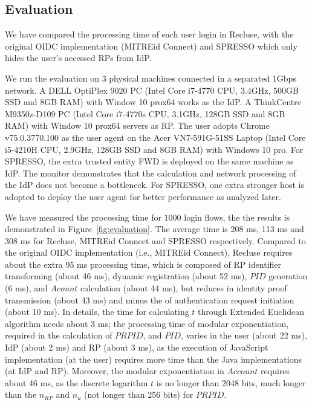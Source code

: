 \subsection{Evaluation}
\label{sec:evaluation}
We have compared the processing time of each user login in Recluse, with the original OIDC implementation (MITREid Connect) and SPRESSO which only hides the user's accessed RPs from IdP.

 We run the evaluation on 3 physical machines connected in a separated 1Gbps network. A DELL OptiPlex 9020 PC (Intel Core i7-4770 CPU, 3.4GHz, 500GB SSD and 8GB RAM) with Window 10 prox64 works as the IdP. A ThinkCentre M9350z-D109 PC (Intel Core i7-4770s CPU, 3.1GHz, 128GB SSD and 8GB RAM) with  Window 10 prox64 servers as RP. The user adopts Chrome v75.0.3770.100 as the user agent on the Acer VN7-591G-51SS Laptop (Intel Core i5-4210H CPU, 2.9GHz, 128GB SSD and 8GB RAM) with  Windows 10 pro. For SPRESSO, the extra trusted entity FWD is deployed on the same machine as IdP. The monitor demonstrates that  the calculation and network processing of the IdP does not become a bottleneck. For SPRESSO, one extra stronger host is adopted to deploy the user agent for better performance as analyzed later.

 We have measured the processing time for $1000$ login flows, the the results is demonstrated in Figure~\ref{fig:evaluation}. The average time is 208 ms, 113 ms and 308 ms for Recluse, MITREid Connect and SPRESSO respectively. Compared to the original OIDC implementation (i.e., MITREid Connect), Recluse requires about the extra 95 ms processing time, which is composed of RP identifier transforming (about 46 ms), dynamic registration (about 52 ms), $PID$ generation (6 ms), and $Acount$ calculation (about 44 ms), but reduces in identity proof transmission (about 43 ms) and minus the of authentication request initiation (about 10 ms). In details, the time for calculating $t$ through Extended Euclidean algorithm needs about 3 ms; the processing time of modular exponentiation, required in the calculation of $PRPID$, and $PID$, varies in the user (about 22 ms), IdP (about 2 ms) and RP (about 3 ms), as the execution of  JavaScript implementation (at the user) requires more time than the Java implementations (at IdP and RP). Moreover, the modular exponentiation in $Account$ requires about 46 ms, as the discrete logarithm $t$ is no longer than 2048 bits, much longer than the $n_{RP}$ and $n_{u}$ (not longer than 256 bits) for $PRPID$.

